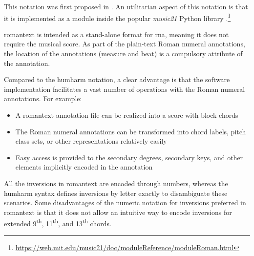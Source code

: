 

This notation was first proposed in
\textcite{gotham2019romantext}. An utilitarian aspect of
this notation is that it is implemented as a module inside
the popular \emph{music21} Python library
\parencite{cuthbert2010music21}.\footnote{\href{https://web.mit.edu/music21/doc/moduleReference/moduleRoman.html}{https://web.mit.edu/music21/doc/moduleReference/moduleRoman.html}}


\gls{romantext} is intended as a stand-alone format for
\gls{rna}, meaning it does not require the musical score. As
part of the plain-text Roman numeral annotations, the
location of the annotations (measure and beat) is a
compulsory attribute of the annotation.

Compared to the \gls{humharm} notation, a clear advantage is
that the software implementation facilitates a vast number
of operations with the Roman numeral annotations. For
example:

\begin{itemize}
    \item A \gls{romantext} annotation file can be realized
    into a score with block chords
    \item The Roman numeral annotations can be transformed
    into chord labels, pitch class sets, or other
    representations relatively easily
    \item Easy access is provided to the secondary degrees,
    secondary keys, and other elements implicitly encoded in
    the annotation
\end{itemize}

All the inversions in \gls{romantext} are encoded through
numbers, whereas the \gls{humharm} syntax defines inversions
by letter exactly to disambiguate these scenarios. Some
disadvantages of the numeric notation for inversions
preferred in \gls{romantext} is that it does not allow an
intuitive way to encode inversions for extended
9\textsuperscript{th}, 11\textsuperscript{th}, and
13\textsuperscript{th} chords. 
